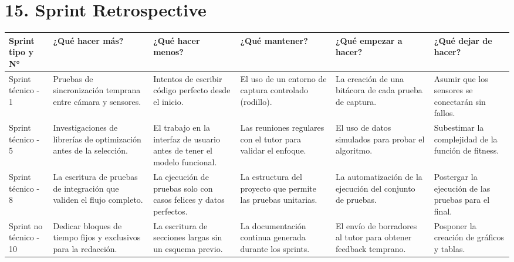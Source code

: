 \documentclass[
11pt, %
]{charter}
\begin{document}
\section{15. Sprint Retrospective}    
\label{sec:sprint_retro}

\begin{table}[htpb]
\renewcommand{\arraystretch}{1.5}
\centering
\begin{tabular}{|>{\raggedright\arraybackslash}p{2.5cm}|
                >{\raggedright\arraybackslash}p{2.2cm}|
                >{\raggedright\arraybackslash}p{2.2cm}|
                >{\raggedright\arraybackslash}p{2.2cm}|
                >{\raggedright\arraybackslash}p{2.2cm}|
                >{\raggedright\arraybackslash}p{2.2cm}|}
\hline
\rowcolor[HTML]{CCCCCC} 
Sprint tipo y N° & ¿Qué hacer más? & ¿Qué hacer menos? & ¿Qué mantener? & ¿Qué empezar a hacer? & ¿Qué dejar de hacer? \\
\hline
Sprint técnico - 1 & Pruebas de sincronización temprana entre cámara y sensores. & Intentos de escribir código perfecto desde el inicio. & El uso de un entorno de captura controlado (rodillo). & La creación de una bitácora de cada prueba de captura. & Asumir que los sensores se conectarán sin fallos. \\
\hline
Sprint técnico - 5 & Investigaciones de librerías de optimización antes de la selección. & El trabajo en la interfaz de usuario antes de tener el modelo funcional. & Las reuniones regulares con el tutor para validar el enfoque. & El uso de datos simulados para probar el algoritmo. & Subestimar la complejidad de la función de fitness. \\
\hline
Sprint técnico - 8 & La escritura de pruebas de integración que validen el flujo completo. & La ejecución de pruebas solo con casos felices y datos perfectos. & La estructura del proyecto que permite las pruebas unitarias. & La automatización de la ejecución del conjunto de pruebas. & Postergar la ejecución de las pruebas para el final. \\
\hline
Sprint no técnico - 10 & Dedicar bloques de tiempo fijos y exclusivos para la redacción. & La escritura de secciones largas sin un esquema previo. & La documentación continua generada durante los sprints. & El envío de borradores al tutor para obtener feedback temprano. & Posponer la creación de gráficos y tablas. \\
\hline
\end{tabular}
\end{table}
\end{document}
